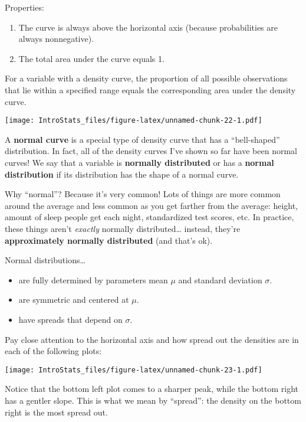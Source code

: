 \documentclass[
]{book}
\providecommand{\tightlist}{%
  \setlength{\itemsep}{0pt}\setlength{\parskip}{0pt}}
\begin{document}
Properties:

\begin{enumerate}
\def\labelenumi{\arabic{enumi}.}
\tightlist
\item
  The curve is always above the horizontal axis (because probabilities are always nonnegative).
\item
  The total area under the curve equals 1.
\end{enumerate}

For a variable with a density curve, the proportion of all possible observations that lie within a specified range equals the corresponding area under the density curve.

\texttt{[image: IntroStats\_files/figure-latex/unnamed-chunk-22-1.pdf]}

A \textbf{normal curve} is a special type of density curve that has a ``bell-shaped'' distribution. In fact, all of the density curves I've shown so far have been normal curves! We say that a variable is \textbf{normally distributed} or has a \textbf{normal distribution} if its distribution has the shape of a normal curve.

Why ``normal''? Because it's very common! Lots of things are more common around the average and less common as you get farther from the average: height, amount of sleep people get each night, standardized test scores, etc. In practice, these things aren't \emph{exactly} normally distributed\ldots{} instead, they're \textbf{approximately normally distributed} (and that's ok).

Normal distributions\ldots{}

\begin{itemize}
\tightlist
\item
  are fully determined by parameters mean \(\mu\) and standard deviation \(\sigma\).
\item
  are symmetric and centered at \(\mu\).
\item
  have spreads that depend on \(\sigma\).
\end{itemize}

Pay close attention to the horizontal axis and how spread out the densities are in each of the following plots:

\texttt{[image: IntroStats\_files/figure-latex/unnamed-chunk-23-1.pdf]}

Notice that the bottom left plot comes to a sharper peak, while the bottom right has a gentler slope. This is what we mean by ``spread'': the density on the bottom right is the most spread out.
\end{document}
